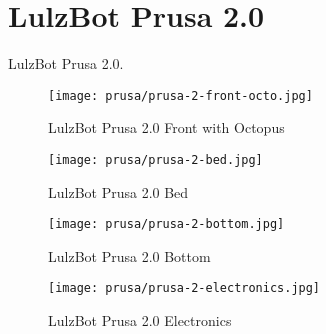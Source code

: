 %
%
%
%
%

\section{LulzBot Prusa 2.0}
LulzBot Prusa 2.0.

\begin{figure}[h!]
\texttt{[image: prusa/prusa-2-front-octo.jpg]}
 \caption{LulzBot Prusa 2.0 Front with Octopus}
 \label{fig:prusa-2-front-octo}
\end{figure}


\begin{figure}[h!]
\texttt{[image: prusa/prusa-2-bed.jpg]}
 \caption{LulzBot Prusa 2.0 Bed}
 \label{fig:prusa-2-bed}
\end{figure}

\begin{figure}[h!]
\texttt{[image: prusa/prusa-2-bottom.jpg]}
 \caption{LulzBot Prusa 2.0 Bottom}
 \label{fig:prusa-2-bottom}
\end{figure}

\begin{figure}[h!]
\texttt{[image: prusa/prusa-2-electronics.jpg]}
 \caption{LulzBot Prusa 2.0 Electronics}
 \label{fig:prusa-2-electronics}
\end{figure}


